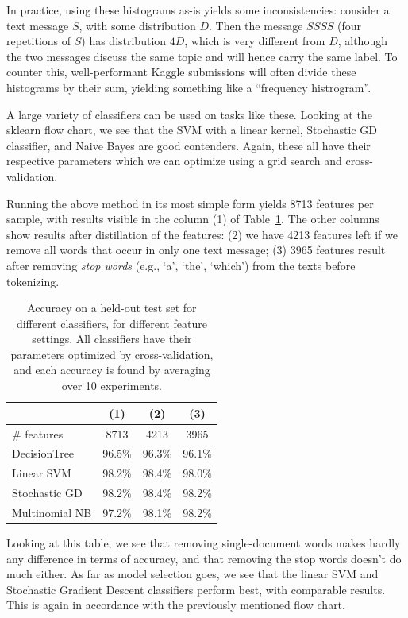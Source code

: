 \documentclass[runningheads,a4paper]{llncs}
\begin{document}
In practice, using these histograms as-is yields some inconsistencies: consider a text message $S$, with some distribution $D$. Then the message $SSSS$ (four repetitions of $S$) has distribution $4D$, which is very different from $D$, although the two messages discuss the same topic and will hence carry the same label.  To counter this, well-performant Kaggle submissions will often divide these histograms by their sum, yielding something like a ``frequency histrogram''.

A large variety of classifiers can be used on tasks like these.  Looking at the sklearn flow chart,\cite{sklearnflow} we see that the SVM with a linear kernel, Stochastic GD classifier, and Naive Bayes are good contenders.  Again, these all have their respective parameters which we can optimize using a grid search and cross-validation.

Running the above method in its most simple form yields 8713 features per sample, with results visible in the column (1) of Table~\ref{tbl:sms}.  The other columns show results after distillation of the features: (2) we have 4213 features left if we remove all words that occur in only one text message; (3) 3965 features result after removing \emph{stop words} (e.g., `a', `the', `which') from the texts before tokenizing.

\begin{table}
\vspace{-2em}
\centering
\begin{tabular}{lccc}
& (1) & (2) & (3) \\\toprule
\# features & 8713 & 4213 & 3965 \\ \midrule
DecisionTree 	& 96.5\% & 96.3\% & 96.1\%\\
Linear SVM 		& 98.2\% & 98.4\% & 98.0\%\\
Stochastic GD 	& 98.2\% & 98.4\% & 98.2\%\\
Multinomial NB 	& 97.2\% & 98.1\% & 98.2\%\\\bottomrule
\end{tabular}
\caption{Accuracy on a held-out test set for different classifiers, for different feature settings.  All classifiers have their parameters optimized by cross-validation, and each accuracy is found by averaging over 10 experiments.}
\label{tbl:sms}
\end{table}

Looking at this table, we see that removing single-document words makes hardly any difference in terms of accuracy, and that removing the stop words doesn't do much either.  As far as model selection goes, we see that the linear SVM and Stochastic Gradient Descent classifiers perform best, with comparable results.  This is again in accordance with the previously mentioned flow chart.
\end{document}
